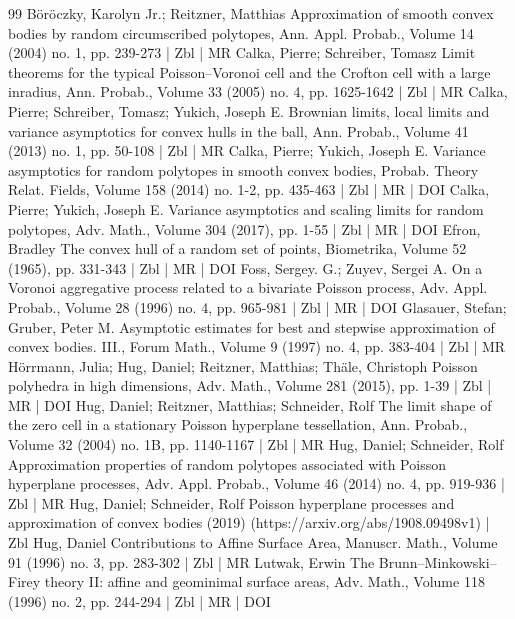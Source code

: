 \begin{thebibliography}{99}
Böröczky, Karolyn Jr.; Reitzner, Matthias Approximation of smooth convex bodies by random circumscribed polytopes, Ann. Appl. Probab., Volume 14 (2004) no. 1, pp. 239-273 | Zbl | MR
Calka, Pierre; Schreiber, Tomasz Limit theorems for the typical Poisson–Voronoi cell and the Crofton cell with a large inradius, Ann. Probab., Volume 33 (2005) no. 4, pp. 1625-1642 | Zbl | MR
Calka, Pierre; Schreiber, Tomasz; Yukich, Joseph E. Brownian limits, local limits and variance asymptotics for convex hulls in the ball, Ann. Probab., Volume 41 (2013) no. 1, pp. 50-108 | Zbl | MR
Calka, Pierre; Yukich, Joseph E. Variance asymptotics for random polytopes in smooth convex bodies, Probab. Theory Relat. Fields, Volume 158 (2014) no. 1-2, pp. 435-463 | Zbl | MR | DOI
Calka, Pierre; Yukich, Joseph E. Variance asymptotics and scaling limits for random polytopes, Adv. Math., Volume 304 (2017), pp. 1-55 | Zbl | MR | DOI
Efron, Bradley The convex hull of a random set of points, Biometrika, Volume 52 (1965), pp. 331-343 | Zbl | MR | DOI
Foss, Sergey. G.; Zuyev, Sergei A. On a Voronoi aggregative process related to a bivariate Poisson process, Adv. Appl. Probab., Volume 28 (1996) no. 4, pp. 965-981 | Zbl | MR | DOI
Glasauer, Stefan; Gruber, Peter M. Asymptotic estimates for best and stepwise approximation of convex bodies. III., Forum Math., Volume 9 (1997) no. 4, pp. 383-404 | Zbl | MR
Hörrmann, Julia; Hug, Daniel; Reitzner, Matthias; Thäle, Christoph Poisson polyhedra in high dimensions, Adv. Math., Volume 281 (2015), pp. 1-39 | Zbl | MR | DOI
Hug, Daniel; Reitzner, Matthias; Schneider, Rolf The limit shape of the zero cell in a stationary Poisson hyperplane tessellation, Ann. Probab., Volume 32 (2004) no. 1B, pp. 1140-1167 | Zbl | MR
Hug, Daniel; Schneider, Rolf Approximation properties of random polytopes associated with Poisson hyperplane processes, Adv. Appl. Probab., Volume 46 (2014) no. 4, pp. 919-936 | Zbl | MR
Hug, Daniel; Schneider, Rolf Poisson hyperplane processes and approximation of convex bodies (2019) (https://arxiv.org/abs/1908.09498v1) | Zbl
Hug, Daniel Contributions to Affine Surface Area, Manuscr. Math., Volume 91 (1996) no. 3, pp. 283-302 | Zbl | MR
Lutwak, Erwin The Brunn–Minkowski–Firey theory II: affine and geominimal surface areas, Adv. Math., Volume 118 (1996) no. 2, pp. 244-294 | Zbl | MR | DOI

\end{thebibliography}
